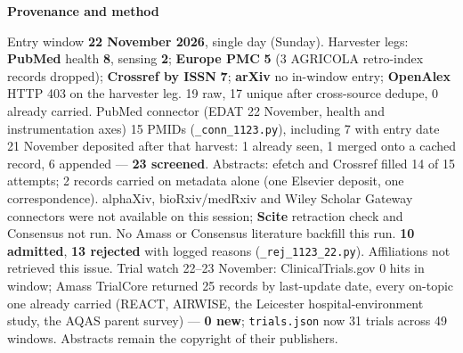 \documentclass[10pt]{article}
\begin{document}
\begin{keybox}
{\sffamily\bfseries\footnotesize\color{Deep}Provenance and method}\\[1.2mm]
{\fontsize{7.2}{8.8}\selectfont
Entry window \textbf{22 November 2026}, single day (Sunday). Harvester legs: \textbf{PubMed} health \textbf{8}, sensing \textbf{2}; \textbf{Europe PMC} \textbf{5} (3 AGRICOLA retro-index records dropped); \textbf{Crossref by ISSN} \textbf{7}; \textbf{arXiv} no in-window entry; \textbf{OpenAlex} HTTP 403 on the harvester leg. 19 raw, 17 unique after cross-source dedupe, 0 already carried. PubMed connector (EDAT 22 November, health and instrumentation axes) 15 PMIDs (\texttt{\_conn\_1123.py}), including 7 with entry date 21 November deposited after that harvest: 1 already seen, 1 merged onto a cached record, 6 appended --- \textbf{23 screened}. Abstracts: efetch and Crossref filled 14 of 15 attempts; 2 records carried on metadata alone (one Elsevier deposit, one correspondence).
alphaXiv, bioRxiv/medRxiv and Wiley Scholar Gateway connectors were not available on this session; \textbf{Scite} retraction check and Consensus not run. No Amass or Consensus literature backfill this run.
\textbf{10 admitted}, \textbf{13 rejected} with logged reasons (\texttt{\_rej\_1123\_22.py}). Affiliations not retrieved this issue. Trial watch 22--23 November: ClinicalTrials.gov 0 hits in window; Amass TrialCore returned 25 records by last-update date, every on-topic one already carried (REACT, AIRWISE, the Leicester hospital-environment study, the AQAS parent survey) --- \textbf{0 new}; \texttt{trials.json} now 31 trials across 49 windows.
Abstracts remain the copyright of their publishers.\par}
\end{keybox}
\end{document}

